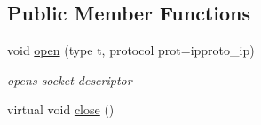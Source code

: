 \subsection*{Public Member Functions}
\begin{CompactItemize}
\item 
void \hyperlink{classsocketpp_1_1BaseSocket_2060dc1b648f83f8bf5ae3d9ecfcd619}{open} (type t, protocol prot=ipproto\_\-ip)
\begin{CompactList}\small\item\em opens socket descriptor \item\end{CompactList}\item 
\hypertarget{classsocketpp_1_1BaseSocket_f067195056bb6b5a65c4bc1d2ac7da72}{
virtual void \hyperlink{classsocketpp_1_1BaseSocket_f067195056bb6b5a65c4bc1d2ac7da72}{close} ()}
\label{classsocketpp_1_1BaseSocket_f067195056bb6b5a65c4bc1d2ac7da72}


\end{CompactItemize}
